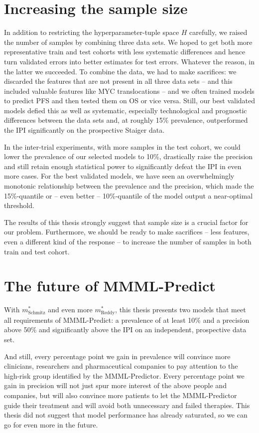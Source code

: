 \section{Increasing the sample size}

In addition to restricting the hyperparameter-tuple space $H$ carefully, we raised the number of 
samples by combining three data sets. We hoped to get both more representative train and test 
cohorts with less systematic differences and hence turn validated errors into better estimates 
for test errors. Whatever the reason, in the latter we succeeded. To combine the data, we had to 
make sacrifices: we discarded the features that are 
not present in all three data sets -- and this included valuable features like MYC translocations -- 
and we often trained models to predict PFS and then tested them on OS or vice versa. Still, our 
best validated models defied this as well as systematic, especially technological and prognostic 
differences between the data sets and, at roughly \num{15}\% prevalence, outperformed the IPI 
significantly on the prospective Staiger data.

In the inter-trial experiments, with more samples in the test cohort, we could lower the prevalence 
of our selected models to \num{10}\%, drastically raise the precision and still retain enough 
statistical power to significantly defeat the IPI in even more cases. For the best validated models, 
we have seen an overwhelmingly monotonic relationship between the prevalence and the precision, 
which made the \num{15}\%-quantile or -- even better -- \num{10}\%-quantile of the model output a 
near-optimal threshold. 

The results of this thesis strongly suggest that sample size is a crucial factor 
for our problem. Furthermore, we should be ready to make sacrifices -- less features, 
even a different kind of the response -- to increase the number of samples in both train and test 
cohort. 

\section{The future of MMML-Predict}

With $m^*_\text{Schmitz}$ and even more $m^*_\text{Reddy}$, this thesis presents two 
models that meet all requirements of MMML-Predict: a prevalence of at least \num{10}\% and a 
precision above \num{50}\% and significantly above the IPI on an independent, prospective data set. 

And still, every percentage point we gain in prevalence will convince more clinicians, researchers 
and pharmaceutical companies to pay attention to the high-risk group identified by the MMML-Predictor.
Every percentage point we gain in precision will not just spur more interest of the above people and 
companies, but will also convince more patients to let the MMML-Predictor guide their treatment and 
will avoid both unnecessary and failed therapies. This thesis did not suggest that model performance 
has already saturated, so we can go for even more in the future.


